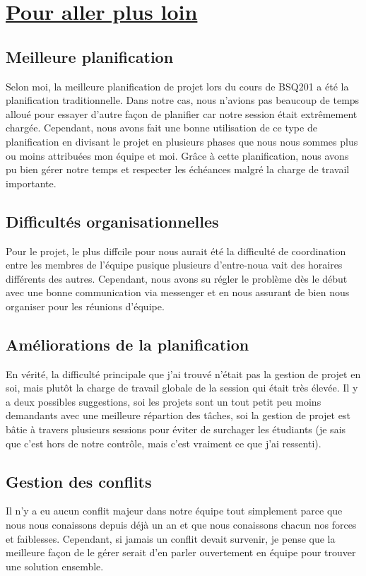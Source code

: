 \documentclass[11pt]{article}
\begin{document}
\newpage
\section{\underline{Pour aller plus loin}}
\subsection{Meilleure planification}
Selon moi, la meilleure planification de projet lors du cours de BSQ201 a été la planification traditionnelle. Dans notre cas, nous n'avions pas beaucoup de temps alloué pour essayer d'autre façon de planifier car notre session était extrêmement chargée. Cependant, nous avons fait une bonne utilisation de ce type de planification en divisant le projet en plusieurs phases que nous nous sommes plus ou moins attribuées mon équipe et moi. Grâce à cette planification, nous avons pu bien gérer notre temps et respecter les échéances malgré la charge de travail importante.
\subsection{Difficultés organisationnelles}
Pour le projet, le plus diffcile pour nous aurait été la difficulté de coordination entre les membres de l'équipe pusique plusieurs d'entre-noua vait des horaires différents des autres. Cependant, nous avons su régler le problème dès le début avec une bonne communication via messenger et en nous assurant de bien nous organiser pour les réunions d'équipe.
\subsection{Améliorations de la planification}
En vérité, la difficulté principale que j'ai trouvé n'était pas la gestion de projet en soi, mais plutôt la charge de travail globale de la session qui était très élevée. Il y a deux possibles suggestions, soi les projets sont un tout petit peu moins demandants avec une meilleure répartion des tâches, soi la gestion de projet est bâtie à travers plusieurs sessions pour éviter de surchager les étudiants (je sais que c'est hors de notre contrôle, mais c'est vraiment ce que j'ai ressenti).
\subsection{Gestion des conflits}
Il n'y a eu aucun conflit majeur dans notre équipe tout simplement parce que nous nous conaissons depuis déjà un an et que nous conaissons chacun nos forces et faiblesses. Cependant, si jamais un conflit devait survenir, je pense que la meilleure façon de le gérer serait d'en parler ouvertement en équipe pour trouver une solution ensemble.
\end{document}
